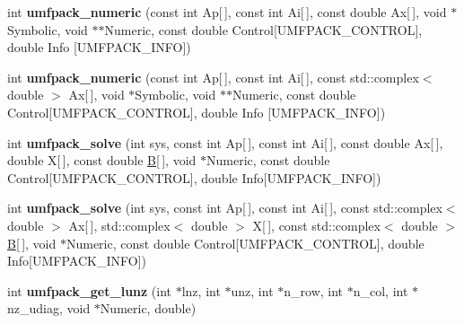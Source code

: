\begin{DoxyCompactItemize}
\item 
\mbox{\label{namespace_eigen_a53029c5ce698ff0242e9086cadd687a0}} 
int {\bfseries umfpack\+\_\+numeric} (const int Ap\mbox{[}$\,$\mbox{]}, const int Ai\mbox{[}$\,$\mbox{]}, const double Ax\mbox{[}$\,$\mbox{]}, void $\ast$Symbolic, void $\ast$$\ast$Numeric, const double Control\mbox{[}U\+M\+F\+P\+A\+C\+K\+\_\+\+C\+O\+N\+T\+R\+OL\mbox{]}, double Info \mbox{[}U\+M\+F\+P\+A\+C\+K\+\_\+\+I\+N\+FO\mbox{]})
\item 
\mbox{\label{namespace_eigen_a4f774fd5f203e87df9b412e2d15280cd}} 
int {\bfseries umfpack\+\_\+numeric} (const int Ap\mbox{[}$\,$\mbox{]}, const int Ai\mbox{[}$\,$\mbox{]}, const std\+::complex$<$ double $>$ Ax\mbox{[}$\,$\mbox{]}, void $\ast$Symbolic, void $\ast$$\ast$Numeric, const double Control\mbox{[}U\+M\+F\+P\+A\+C\+K\+\_\+\+C\+O\+N\+T\+R\+OL\mbox{]}, double Info \mbox{[}U\+M\+F\+P\+A\+C\+K\+\_\+\+I\+N\+FO\mbox{]})
\item 
\mbox{\label{namespace_eigen_a4f4b67e7827ef63894888bb9475512dc}} 
int {\bfseries umfpack\+\_\+solve} (int sys, const int Ap\mbox{[}$\,$\mbox{]}, const int Ai\mbox{[}$\,$\mbox{]}, const double Ax\mbox{[}$\,$\mbox{]}, double X\mbox{[}$\,$\mbox{]}, const double \hyperlink{group___core___module_class_eigen_1_1_matrix}{B}\mbox{[}$\,$\mbox{]}, void $\ast$Numeric, const double Control\mbox{[}U\+M\+F\+P\+A\+C\+K\+\_\+\+C\+O\+N\+T\+R\+OL\mbox{]}, double Info\mbox{[}U\+M\+F\+P\+A\+C\+K\+\_\+\+I\+N\+FO\mbox{]})
\item 
\mbox{\label{namespace_eigen_acccc7c4e4af80e69a83dafe8df474372}} 
int {\bfseries umfpack\+\_\+solve} (int sys, const int Ap\mbox{[}$\,$\mbox{]}, const int Ai\mbox{[}$\,$\mbox{]}, const std\+::complex$<$ double $>$ Ax\mbox{[}$\,$\mbox{]}, std\+::complex$<$ double $>$ X\mbox{[}$\,$\mbox{]}, const std\+::complex$<$ double $>$ \hyperlink{group___core___module_class_eigen_1_1_matrix}{B}\mbox{[}$\,$\mbox{]}, void $\ast$Numeric, const double Control\mbox{[}U\+M\+F\+P\+A\+C\+K\+\_\+\+C\+O\+N\+T\+R\+OL\mbox{]}, double Info\mbox{[}U\+M\+F\+P\+A\+C\+K\+\_\+\+I\+N\+FO\mbox{]})
\item 
\mbox{\label{namespace_eigen_af2916b9529f0938350692d56d527a047}} 
int {\bfseries umfpack\+\_\+get\+\_\+lunz} (int $\ast$lnz, int $\ast$unz, int $\ast$n\+\_\+row, int $\ast$n\+\_\+col, int $\ast$nz\+\_\+udiag, void $\ast$Numeric, double)

\end{DoxyCompactItemize}
